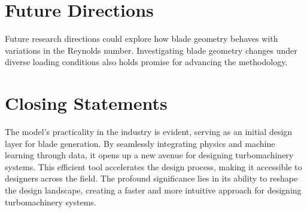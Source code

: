 \section{Future Directions}

Future research directions could explore how blade geometry behaves with variations in the Reynolds number. Investigating blade geometry changes under diverse loading conditions also holds promise for advancing the methodology.



\section{Closing Statements}

The model's practicality in the industry is evident, serving as an initial design layer for blade generation. By seamlessly integrating physics and machine learning through data, it opens up a new avenue for designing turbomachinery systems. This efficient tool accelerates the design process, making it accessible to designers across the field. The profound significance lies in its ability to reshape the design landscape, creating a faster and more intuitive approach for designing turbomachinery systems.